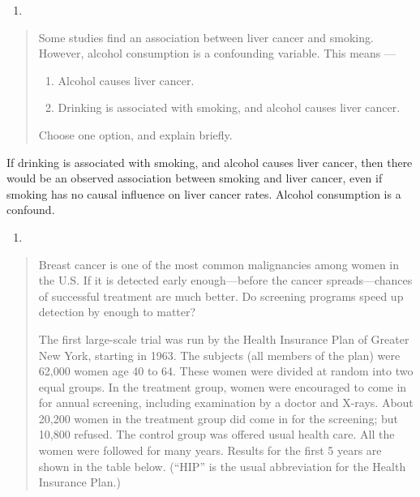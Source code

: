 \documentclass[
]{book}
\providecommand{\tightlist}{%
  \setlength{\itemsep}{0pt}\setlength{\parskip}{0pt}}
\begin{document}
\begin{enumerate}
\def\labelenumi{\arabic{enumi}.}
\setcounter{enumi}{7}
\tightlist
\item
\end{enumerate}

\begin{quote}
Some studies find an association between liver cancer and smoking. However, alcohol consumption is a confounding variable. This means ---

\begin{enumerate}
\def\labelenumi{\arabic{enumi}.}
\tightlist
\item
  Alcohol causes liver cancer.
\item
  Drinking is associated with smoking, and alcohol causes liver cancer.
\end{enumerate}

Choose one option, and explain briefly.
\end{quote}

If drinking is associated with smoking, and alcohol causes liver cancer, then there would be an observed association between smoking and liver cancer, even if smoking has no causal influence on liver cancer rates. Alcohol consumption is a confound.

\begin{enumerate}
\def\labelenumi{\arabic{enumi}.}
\setcounter{enumi}{8}
\tightlist
\item
\end{enumerate}

\begin{quote}
Breast cancer is one of the most common malignancies among women in the U.S. If it is detected early enough---before the cancer spreads---chances of successful treatment are much better. Do screening programs speed up detection by enough
to matter?

The first large-scale trial was run by the Health Insurance Plan of Greater New York, starting in 1963. The subjects (all members of the plan) were 62,000 women age 40 to 64. These women were divided at random into two equal groups. In the treatment group, women were encouraged to come in for annual screening, including examination by a doctor and X-rays. About 20,200 women in the treatment group did come in for the screening; but 10,800 refused. The control group was offered usual health care. All the women were followed for many years. Results for the first 5 years are shown in the table below. (``HIP'' is the usual abbreviation for the Health Insurance Plan.)
\end{quote}
\end{document}
